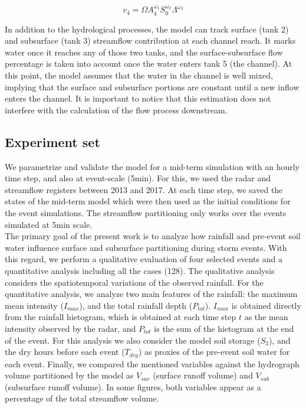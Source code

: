 \documentclass[preprint,12pt]{elsarticle}
\begin{document}
\begin{equation}
 v_4 = \Omega A_4^{\omega_1} S_0^{\omega_2} \Lambda^{\omega_3} 
    \label{eq:ocg}
\end{equation}

In addition to the hydrological processes, the model can track surface (tank 2) and subsurface (tank 3) streamflow contribution at each channel reach. It marks water once it reaches any of those two tanks, and the surface-subsurface flow percentage is taken into account once the water enters tank 5 (the channel).   At this point, the model assumes that the water in the channel is well mixed,  implying that the surface and subsurface portions are constant until a new inflow enters the channel.  It is important to notice that this estimation does not interfere with the calculation of the flow process downstream.\\ 

\subsection{Experiment set}

We parametrize and validate the model for a mid-term simulation with an hourly time step, and also at event-scale (5min).  For this, we used the radar and streamflow registers between 2013 and 2017.  At each time step, we saved the states of the mid-term model which were then used as the initial conditions for the event simulations.  The streamflow partitioning only works over the events simulated at 5min scale.\\

The primary goal of the present work is to analyze how rainfall and pre-event soil water influence surface and subsurface partitioning during storm events.  With this regard, we perform a qualitative evaluation of four selected events and a quantitative analysis including all the cases (128).  The qualitative analysis considers the spatiotemporal variations of the observed rainfall.  For the quantitative analysis, we analyze two main features of the rainfall: the maximum mean intensity ($I_{max}$), and the total rainfall depth ($P_{tot}$).  $I_{max}$ is obtained directly from the rainfall hietogram, which is obtained at each time step $t$ as the mean intensity observed by the radar, and $P_{tot}$ is the sum of the hietogram at the end of the event.  For this analysis we also consider the model soil storage ($S_3$), and the dry hours before each event ($T_{dry}$) as proxies of the pre-event soil water for each event.   Finally, we compared the mentioned variables against the hydrograph volume partitioned by the model as $V_{sur}$ (surface runoff volume) and $V_{sub}$ (subsurface runoff volume).  In some figures, both variables appear as a percentage of the total streamflow volume.\\
\end{document}
